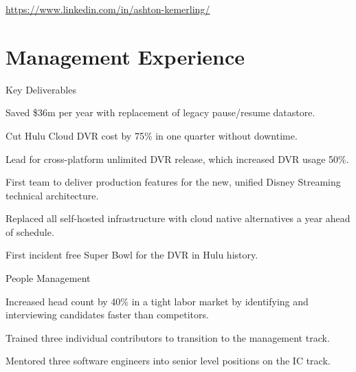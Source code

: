 \documentclass[]{deedy-resume-openfont}
\begin{document}
%
%


%
%



\href{https://www.linkedin.com/in/ashton-kemerling/}{https://www.linkedin.com/in/ashton-kemerling/}

\begin{center}
\end{center}

\section{Management Experience}

\vspace{\topsep}
Key Deliverables
\begin{tightemize}
\item Saved \$36m per year with replacement of legacy pause/resume datastore.
\item Cut Hulu Cloud DVR cost by 75\% in one quarter without downtime.
\item Lead for cross-platform unlimited DVR release, which increased DVR usage 50\%.
\item First team to deliver production features for the new, unified Disney Streaming technical architecture.
\item Replaced all self-hosted infrastructure with cloud native alternatives a year ahead of schedule.
\item First incident free Super Bowl for the DVR in Hulu history.
\end{tightemize}

\sectionsep
People Management
\begin{tightemize}
\item Increased head count by 40\% in a tight labor market by identifying and interviewing candidates faster than competitors.
\item Trained three individual contributors to transition to the management track.
\item Mentored three software engineers into senior level positions on the IC track.
\end{tightemize}
\sectionsep
\end{document}

